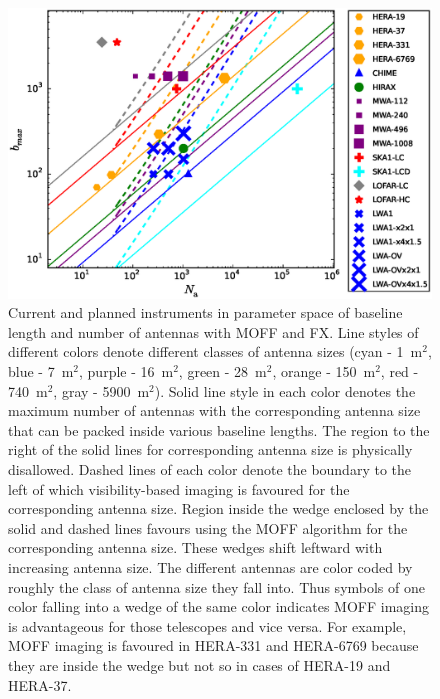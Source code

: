 \documentclass[a4paper,fleqn,usenatbib]{mnras}
\begin{document}
\begin{figure}
  \includegraphics[width=\columnwidth]{figure11}
  \caption{Current and planned instruments in parameter space of
    baseline length and number of antennas with MOFF and FX. Line styles of 
    different colors denote different classes of antenna sizes (cyan - 1~m$^2$, 
    blue - 7~m$^2$, purple - 16~m$^2$, green - 28~m$^2$, orange - 150~m$^2$, 
    red - 740~m$^2$, gray - 5900~m$^2$). Solid line style in each color denotes 
    the maximum number of antennas with the corresponding antenna size that can 
    be packed inside various baseline lengths. The region to the right of the 
    solid lines for corresponding antenna size is physically disallowed. Dashed
    lines of each color denote the boundary to the left of which 
    visibility-based imaging is favoured for the corresponding antenna size. 
    Region inside the wedge enclosed by the solid and dashed lines favours using 
    the MOFF algorithm for the corresponding antenna size. These wedges shift 
    leftward with increasing antenna size. The different antennas are color 
    coded by roughly the class of antenna size they fall into. Thus symbols of 
    one color falling into a wedge of the same color indicates MOFF imaging is 
    advantageous for those telescopes and vice versa. For example, MOFF imaging
    is favoured in HERA-331 and HERA-6769 because they are inside the wedge 
    but not so in cases of HERA-19 and HERA-37.}
  \label{fig:parameter-space-bll-nant-instruments}
\end{figure}
\end{document}
